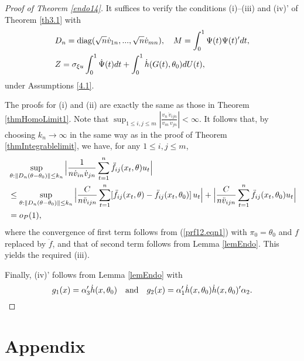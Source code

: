 \begin{proof}[Proof of Theorem \ref {endo14}]
It suffices to verify the conditions (i)--(iii) and (iv)' of Theorem \ref {th3.1} with
\begin{align}
&D_n=\mbox{diag} (\sqrt n\dot{v}_{1n}, ...,\sqrt n\dot{v}_{mn}),  \quad M = \int_{0}^{1}\Psi(t) \Psi(t)' dt, \nonumber\\
& Z = \sigma_{\xi u} \int_{0}^{1} \dot{\Psi}(t)dt +    \int_{0}^{1} \dot{h}(G(t), \theta_0) dU(t),
\end{align}
under Assumptions \ref {4.1}.

The proofs for (i) and (ii)  are exactly the same as those in Theorem \ref{thmHomoLimit1}. Note that $\sup_{1 \le i, j \le m} | \frac{v_n\, \ddot v_{ijn}}{\dot v_{in}\,  \dot v_{jn}}|<\infty$. It follows that, by choosing $k_n \to \infty$ in the same way as in the proof of Theorem \ref{thmIntegrablelimit}, we have, for any $1 \le i,j \le m$,
\begin{align}
 &\sup_{\theta:\parallel D_n(\theta-\theta_0)\parallel\le k_n} \Big |\frac{1}{n \dot{v}_{in} \dot{v}_{jn}}  \sum_{t = 1}^n \ddot{f}_{ij}(x_t, \theta) u_t \Big | \nonumber\\
 &\le \sup_{\theta:\parallel D_n(\theta-\theta_0)\parallel\le k_n}\Big | \frac{C}{n \ddot{v}_{ijn}}  \sum_{t = 1}^n [\ddot{f}_{ij}(x_t, \theta) - \ddot{f}_{ij}(x_t, \theta_0)]\, u_t \Big |  + \Big | \frac{C}{n \ddot{v}_{ijn}}  \sum_{t = 1}^n  \ddot{f}_{ij}(x_t, \theta_0) u_t\Big | \nonumber\\
&= o_P(1),\nonumber
\end{align}
where the convergence of first term follows from (\ref{prf12.eqn1}) with $\pi_0 = \theta_0$ and $f$ replaced by $\ddot{f}$, and that of second term follows from Lemma \ref{lemEndo}. This yields the required (iii).

Finally, (iv)' follows from Lemma \ref{lemEndo} with
\begin{equation*}
g_1(x)=\alpha_3'\dot{h}(x, \theta_0) \quad \mbox{and} \quad g_2(x)=\alpha_1'\dot{h}(x, \theta_0) \dot{h}(x, \theta_0)'\alpha_2.
\end{equation*}
\end{proof}

\section{Appendix}

